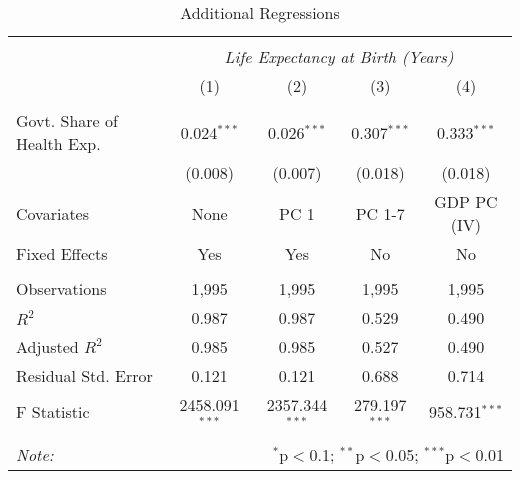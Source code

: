 \begin{table}[!htbp] \centering
  \caption{Additional Regressions \label{additional_regs}}
\begin{tabular}{@{\extracolsep{5pt}}lcccc}
\\[-1.8ex]\hline
\hline \\[-1.8ex]
& \multicolumn{4}{c}{\textit{Life Expectancy at Birth (Years)}} \
\cr \
\\[-1.8ex] & (1) & (2) & (3) & (4) \\
\hline \\[-1.8ex]
 Govt. Share of Health Exp. & 0.024$^{***}$ & 0.026$^{***}$ & 0.307$^{***}$ & 0.333$^{***}$ \\
  & (0.008) & (0.007) & (0.018) & (0.018) \\
 Covariates & None & PC 1 & PC 1-7 & GDP PC (IV) \\
 Fixed Effects & Yes & Yes & No & No \\
\hline \\[-1.8ex]
 Observations & 1,995 & 1,995 & 1,995 & 1,995 \\
 $R^2$ & 0.987 & 0.987 & 0.529 & 0.490 \\
 Adjusted $R^2$ & 0.985 & 0.985 & 0.527 & 0.490 \\
 Residual Std. Error & 0.121 & 0.121 & 0.688 & 0.714  \\
 F Statistic & 2458.091$^{***}$  & 2357.344$^{***}$  & 279.197$^{***}$  & 958.731$^{***}$  \\
\hline
\hline \\[-1.8ex]
\textit{Note:} & \multicolumn{4}{r}{$^{*}$p$<$0.1; $^{**}$p$<$0.05; $^{***}$p$<$0.01} \\
\end{tabular}
\end{table}